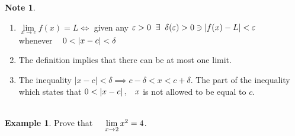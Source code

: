 \documentclass[11pt,a4paper]{article}
\theoremstyle{definition}
\newtheorem{exa}[thm]{Example}
\newtheorem*{note}{Note}
\begin{document}
\begin{note}
\begin{enumerate}
\item $\lim\limits_{x \rightarrow c} f(x) = L \iff$ given any $\varepsilon > 0 \hspace{0.2cm} \exists \hspace{0.2cm} \delta (\varepsilon) > 0 \ni \left|f(x) - L\right| < \varepsilon$\\ whenever $\hspace{0.3cm} 0 < \left|x - c\right| < \delta$

\item The definition implies that there can be at most one limit.

\item The inequality $\left|x - c\right| < \delta \implies c - \delta < x < c + \delta$. The part of the inequality which states that $0 < \left|x - c\right|, \hspace{0.3cm} x$ is not allowed to be equal to $c$.\\\\
\end{enumerate}
\end{note}

\begin{exa}


Prove that $\hspace{0.4cm} \lim\limits_{x \rightarrow 2} x^2 = 4$.
\end{exa}
\end{document}
